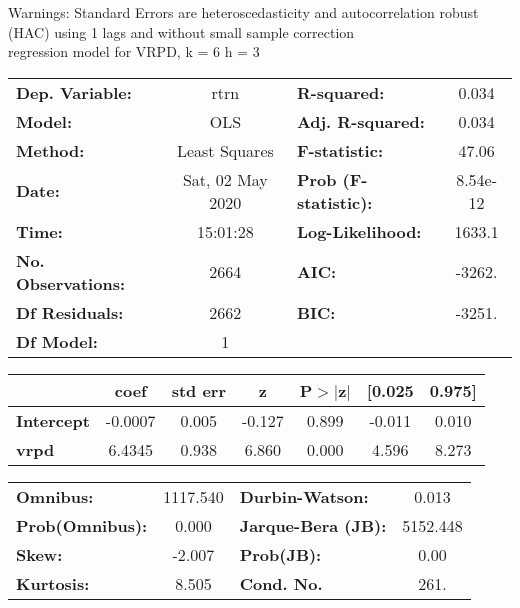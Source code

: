 Warnings: \newline
 [1] Standard Errors are heteroscedasticity and autocorrelation robust (HAC) using 1 lags and without small sample correction\\ 

regression model for VRPD, k = 6 h = 3\begin{center}
\begin{tabular}{lclc}
\toprule
\textbf{Dep. Variable:}    &       rtrn       & \textbf{  R-squared:         } &     0.034   \\
\textbf{Model:}            &       OLS        & \textbf{  Adj. R-squared:    } &     0.034   \\
\textbf{Method:}           &  Least Squares   & \textbf{  F-statistic:       } &     47.06   \\
\textbf{Date:}             & Sat, 02 May 2020 & \textbf{  Prob (F-statistic):} &  8.54e-12   \\
\textbf{Time:}             &     15:01:28     & \textbf{  Log-Likelihood:    } &    1633.1   \\
\textbf{No. Observations:} &        2664      & \textbf{  AIC:               } &    -3262.   \\
\textbf{Df Residuals:}     &        2662      & \textbf{  BIC:               } &    -3251.   \\
\textbf{Df Model:}         &           1      & \textbf{                     } &             \\
\bottomrule
\end{tabular}
\begin{tabular}{lcccccc}
                   & \textbf{coef} & \textbf{std err} & \textbf{z} & \textbf{P$> |$z$|$} & \textbf{[0.025} & \textbf{0.975]}  \\
\midrule
\textbf{Intercept} &      -0.0007  &        0.005     &    -0.127  &         0.899        &       -0.011    &        0.010     \\
\textbf{vrpd}      &       6.4345  &        0.938     &     6.860  &         0.000        &        4.596    &        8.273     \\
\bottomrule
\end{tabular}
\begin{tabular}{lclc}
\textbf{Omnibus:}       & 1117.540 & \textbf{  Durbin-Watson:     } &    0.013  \\
\textbf{Prob(Omnibus):} &   0.000  & \textbf{  Jarque-Bera (JB):  } & 5152.448  \\
\textbf{Skew:}          &  -2.007  & \textbf{  Prob(JB):          } &     0.00  \\
\textbf{Kurtosis:}      &   8.505  & \textbf{  Cond. No.          } &     261.  \\
\bottomrule
\end{tabular}
\end{center}

